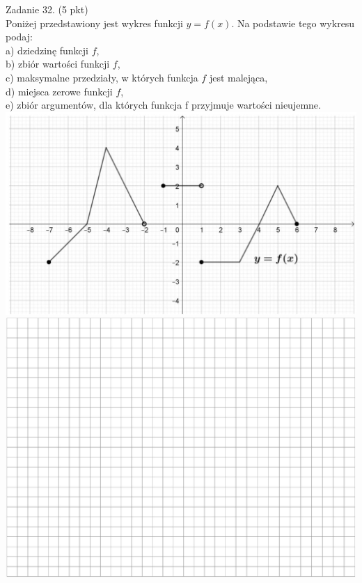 \documentclass[10pt]{article}
\begin{document}
Zadanie 32. (5 pkt)\\
Poniżej przedstawiony jest wykres funkcji \(y=f(x)\). Na podstawie tego wykresu podaj:\\
a) dziedzinę funkcji \(f\),\\
b) zbiór wartości funkcji \(f\),\\
c) maksymalne przedziały, w których funkcja \(f\) jest malejąca,\\
d) miejsca zerowe funkcji \(f\),\\
e) zbiór argumentów, dla których funkcja f przyjmuje wartości nieujemne.\\
\includegraphics[max width=\textwidth, center]{2024_11_21_87037534e5fdc524263ag-11}\\
\includegraphics[max width=\textwidth, center]{2024_11_21_87037534e5fdc524263ag-11(1)}
\end{document}
